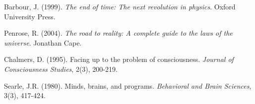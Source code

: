 \documentclass[12pt]{article}
\begin{document}
\begin{thebibliography}{99}
Barbour, J. (1999). \emph{The end of time: The next revolution in physics}. Oxford University Press.

Penrose, R. (2004). \emph{The road to reality: A complete guide to the laws of the universe}. Jonathan Cape.

Chalmers, D. (1995). Facing up to the problem of consciousness. \emph{Journal of Consciousness Studies}, 2(3), 200-219.

Searle, J.R. (1980). Minds, brains, and programs. \emph{Behavioral and Brain Sciences}, 3(3), 417-424.

\end{thebibliography}
\end{document}
